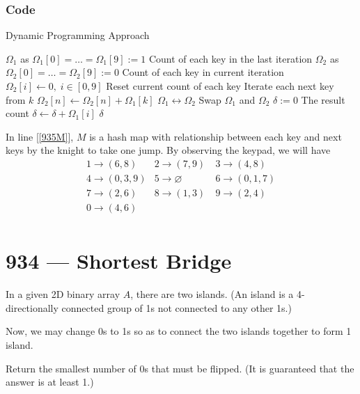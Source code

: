 \subsubsection{Code}
\setcounter{algorithm}{0}
\begin{algorithm}[H]
\caption{Dynamic Programming Approach}
\begin{algorithmic}[1]
\State $\Omega_1$ as $\Omega_1[0]=\ldots=\Omega_1[9]:=1$ \Comment Count of each key in the last iteration
\State $\Omega_2$ as $\Omega_2[0]=\ldots=\Omega_2[9]:=0$ \Comment Count of each key in current iteration
\State $\Omega_2[i] \gets 0, \; i\in [0,9]$ \Comment Reset current count of each key
 \Comment Iterate each next key from $k$ \label{935M}
\State $\Omega_2[n] \gets \Omega_2[n] + \Omega_1[k]$
\EndFor
\EndFor
\State $\Omega_1 \leftrightarrow \Omega_2$ \Comment Swap $\Omega_1$ and $\Omega_2$
\EndFor
\State $\delta:=0$ \Comment The result count
\State $\delta\gets\delta+\Omega_1[i]$
\EndFor
\State \Return $\delta$
\EndProcedure
\end{algorithmic}
\end{algorithm}
In line [\ref{935M}], $M$ is a hash map with relationship between each key and next keys by the knight to take one jump. By observing the keypad, we will have
\[
\begin{array}{lll}
1 \longrightarrow (6, 8) & 2 \longrightarrow (7, 9)\ & 3 \longrightarrow (4, 8) \\
4 \longrightarrow (0,3,9) & 5 \longrightarrow \varnothing & 6 \longrightarrow (0,1,7) \\
7 \longrightarrow (2,6) & 8 \longrightarrow (1,3) & 9 \longrightarrow (2,4) \\
0 \longrightarrow (4,6) & & \\
\end{array}
\]

\section{934 --- Shortest Bridge}
In a given 2D binary array $A$, there are two islands.  (An island is a 4-directionally connected group of 1s not connected to any other 1s.)
\par
Now, we may change 0s to 1s so as to connect the two islands together to form 1 island.
\par
Return the smallest number of 0s that must be flipped.  (It is guaranteed that the answer is at least 1.)

